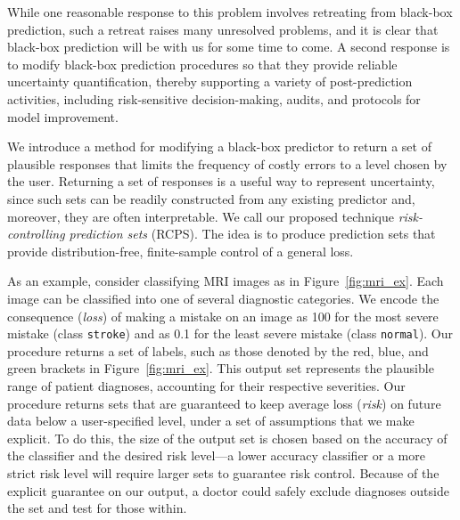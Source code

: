 \documentclass[10pt]{article}
\begin{document}
While one reasonable response to this problem involves retreating from black-box prediction, such a retreat raises many unresolved problems, and it is clear that black-box prediction will be with us for some time to come.  A second response is to modify black-box prediction procedures so that they provide reliable uncertainty quantification, thereby supporting a variety of post-prediction activities, including risk-sensitive decision-making, audits, and protocols for model improvement.

We introduce a method for modifying a black-box predictor to return a set of plausible responses that  limits the frequency of costly errors to a level chosen by the user. Returning a set of responses is a useful way to represent uncertainty, since such sets can be readily constructed from any existing predictor and, moreover, they are often interpretable. We call our proposed technique \emph{risk-controlling prediction sets} (RCPS).  The idea is to produce prediction sets that provide distribution-free, finite-sample control of a general loss.

As an example, consider classifying MRI images as in Figure~\ref{fig:mri_ex}.
Each image can be classified into one of several diagnostic categories. 
We encode the consequence (\emph{loss}) of making a mistake on an image as 100 for the most severe mistake (class \texttt{stroke}) and as 0.1 for the least severe mistake (class \texttt{normal}).
Our procedure returns a set of labels, such as those denoted by the red, blue, and green brackets in Figure~\ref{fig:mri_ex}. This output set represents the plausible range of patient diagnoses, accounting for their respective severities.  Our procedure returns sets that are guaranteed to keep average loss (\emph{risk}) on future data below a user-specified level, under a set of assumptions that we make explicit. To do this, the size of the output set is chosen based on the accuracy of the classifier and the desired risk level---a lower accuracy classifier or a more strict risk level will require larger sets to guarantee risk control.
Because of the explicit guarantee on our output, a doctor could safely exclude diagnoses outside the set and test for those within.
\end{document}
